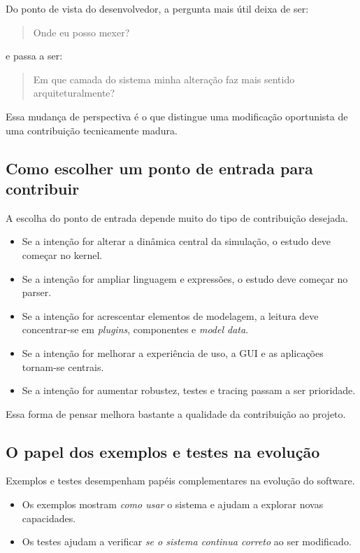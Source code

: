 Do ponto de vista do desenvolvedor, a pergunta mais útil deixa de ser:
\begin{quote}
    Onde eu posso mexer?
\end{quote}
e passa a ser:
\begin{quote}
    Em que camada do sistema minha alteração faz mais sentido arquiteturalmente?
\end{quote}

Essa mudança de perspectiva é o que distingue uma modificação oportunista de uma contribuição tecnicamente madura.

\subsection{Como escolher um ponto de entrada para contribuir}
\label{subsec:cap10_como_escolher_ponto_entrada}

A escolha do ponto de entrada depende muito do tipo de contribuição desejada.

\begin{itemize}
    \item Se a intenção for alterar a dinâmica central da simulação, o estudo deve começar no kernel.
    \item Se a intenção for ampliar linguagem e expressões, o estudo deve começar no parser.
    \item Se a intenção for acrescentar elementos de modelagem, a leitura deve concentrar-se em \textit{plugins}, componentes e \textit{model data}.
    \item Se a intenção for melhorar a experiência de uso, a GUI e as aplicações tornam-se centrais.
    \item Se a intenção for aumentar robustez, testes e tracing passam a ser prioridade.
\end{itemize}

Essa forma de pensar melhora bastante a qualidade da contribuição ao projeto.

\subsection{O papel dos exemplos e testes na evolução}
\label{subsec:cap10_papel_exemplos_testes_evolucao}

Exemplos e testes desempenham papéis complementares na evolução do software.

\begin{itemize}
    \item Os exemplos mostram \emph{como usar} o sistema e ajudam a explorar novas capacidades.
    \item Os testes ajudam a verificar \emph{se o sistema continua correto} ao ser modificado.
\end{itemize}

